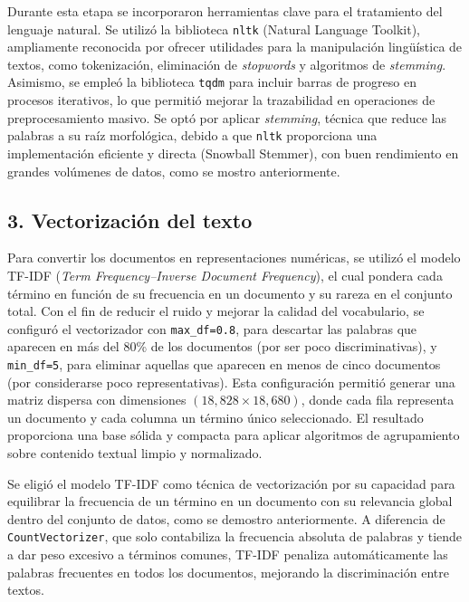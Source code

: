 \documentclass[journal]{IEEEtran}
\begin{document}
Durante esta etapa se incorporaron herramientas clave para el tratamiento del lenguaje natural. Se utilizó la biblioteca \texttt{nltk} (Natural Language Toolkit), ampliamente reconocida por ofrecer utilidades para la manipulación lingüística de textos, como tokenización, eliminación de \textit{stopwords} y algoritmos de \textit{stemming}. Asimismo, se empleó la biblioteca \texttt{tqdm} para incluir barras de progreso en procesos iterativos, lo que permitió mejorar la trazabilidad en operaciones de preprocesamiento masivo. Se optó por aplicar \textit{stemming}, técnica que reduce las palabras a su raíz morfológica, debido a que \texttt{nltk} proporciona una implementación eficiente y directa (Snowball Stemmer), con buen rendimiento en grandes volúmenes de datos, como se mostro anteriormente.

\subsection*{3. Vectorización del texto}
Para convertir los documentos en representaciones numéricas, se utilizó el modelo TF-IDF (\textit{Term Frequency--Inverse Document Frequency}), el cual pondera cada término en función de su frecuencia en un documento y su rareza en el conjunto total. Con el fin de reducir el ruido y mejorar la calidad del vocabulario, se configuró el vectorizador con \texttt{max\_df=0.8}, para descartar las palabras que aparecen en más del 80\% de los documentos (por ser poco discriminativas), y \texttt{min\_df=5}, para eliminar aquellas que aparecen en menos de cinco documentos (por considerarse poco representativas). Esta configuración permitió generar una matriz dispersa con dimensiones $(18,\!828 \times 18,\!680)$, donde cada fila representa un documento y cada columna un término único seleccionado. El resultado proporciona una base sólida y compacta para aplicar algoritmos de agrupamiento sobre contenido textual limpio y normalizado.

\vspace{12pt}
Se eligió el modelo TF-IDF como técnica de vectorización por su capacidad para equilibrar la frecuencia de un término en un documento con su relevancia global dentro del conjunto de datos, como se demostro anteriormente. A diferencia de \texttt{CountVectorizer}, que solo contabiliza la frecuencia absoluta de palabras y tiende a dar peso excesivo a términos comunes, TF-IDF penaliza automáticamente las palabras frecuentes en todos los documentos, mejorando la discriminación entre textos.
\end{document}
